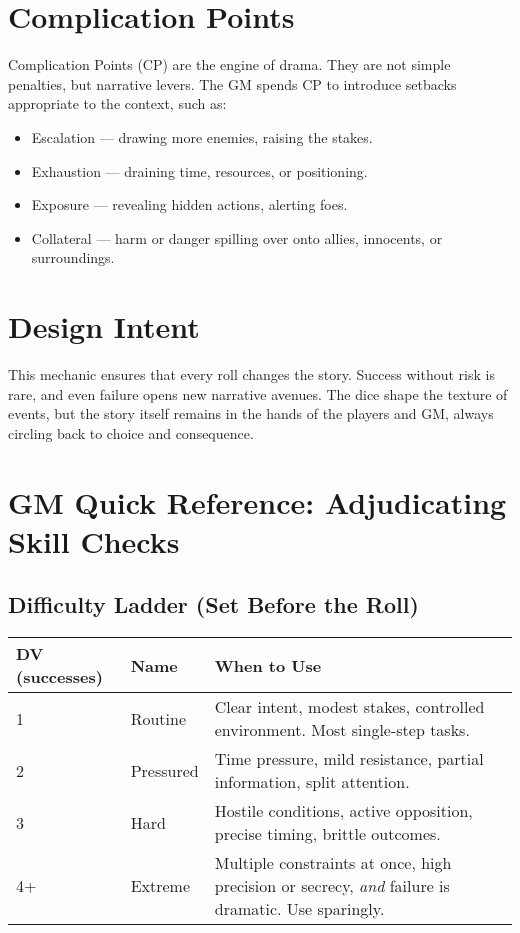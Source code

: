 \documentclass[12pt]{article}
\begin{document}
\section{Complication Points}

Complication Points (CP) are the engine of drama. They are not simple penalties, but narrative levers.  
The GM spends CP to introduce setbacks appropriate to the context, such as:

\begin{itemize}
  \item Escalation — drawing more enemies, raising the stakes.  
  \item Exhaustion — draining time, resources, or positioning.  
  \item Exposure — revealing hidden actions, alerting foes.  
  \item Collateral — harm or danger spilling over onto allies, innocents, or surroundings.  
\end{itemize}

\section{Design Intent}

This mechanic ensures that every roll changes the story. Success without risk is rare, and even failure opens new narrative avenues. The dice shape the texture of events, but the story itself remains in the hands of the players and GM, always circling back to choice and consequence.

\section{GM Quick Reference: Adjudicating Skill Checks}

\subsection{Difficulty Ladder (Set Before the Roll)}
\begin{tabular}{@{}llp{8.5cm}@{}}
\toprule
\textbf{DV (successes)} & \textbf{Name} & \textbf{When to Use} \\
\midrule
1 & Routine & Clear intent, modest stakes, controlled environment. Most single-step tasks. \\
2 & Pressured & Time pressure, mild resistance, partial information, split attention. \\
3 & Hard & Hostile conditions, active opposition, precise timing, brittle outcomes. \\
4+ & Extreme & Multiple constraints at once, high precision or secrecy, \emph{and} failure is dramatic. Use sparingly. \\
\bottomrule
\end{tabular}
\end{document}
